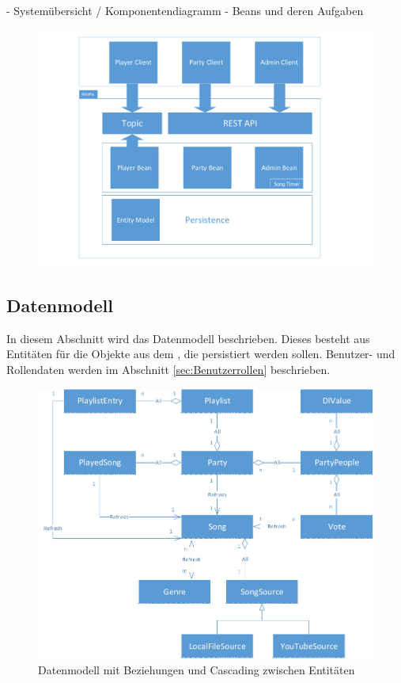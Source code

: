
- Systemübersicht / Komponentendiagramm
- Beans und deren Aufgaben

\begin{figure}[H]
	\centering
	\includegraphics[width=1\linewidth]{Bilder/Komponentendiagramm}
	\caption{}
	\label{fig:Komponentendiagramm}
\end{figure}


\subsection{Datenmodell}

In diesem Abschnitt wird das Datenmodell beschrieben. Dieses besteht aus Entitäten für die Objekte aus dem , die persistiert werden sollen. Benutzer- und Rollendaten werden im Abschnitt \ref{sec:Benutzerrollen} beschrieben.

\begin{figure}[htb]
\centering
\includegraphics[width=1\linewidth]{Bilder/Datenmodell}
\caption{Datenmodell mit Beziehungen und Cascading zwischen Entitäten}
\label{fig:Datenmodell}
\end{figure}

